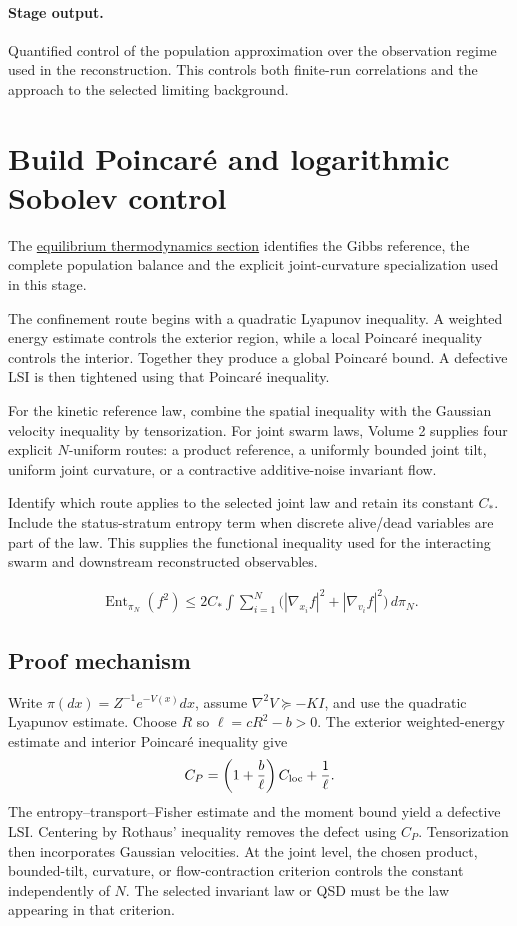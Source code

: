 \documentclass[11pt,a4paper]{article}
\begin{document}
\paragraph{Stage output.} Quantified control of the population approximation over the observation regime used in the reconstruction. This controls both finite-run correlations and the approach to the selected limiting background.

\section{Build Poincar\'e and logarithmic Sobolev control}
\label{stage:7}
The \hyperref[sec:equilibrium-thermodynamics]{equilibrium thermodynamics section} identifies the Gibbs reference, the complete population balance and the explicit joint-curvature specialization used in this stage.

The confinement route begins with a quadratic Lyapunov inequality. A weighted energy estimate controls the exterior region, while a local Poincar\'e inequality controls the interior. Together they produce a global Poincar\'e bound. A defective LSI is then tightened using that Poincar\'e inequality.

For the kinetic reference law, combine the spatial inequality with the Gaussian velocity inequality by tensorization. For joint swarm laws, Volume 2 supplies four explicit \(N\)-uniform routes: a product reference, a uniformly bounded joint tilt, uniform joint curvature, or a contractive additive-noise invariant flow.

Identify which route applies to the selected joint law and retain its constant \(C_*\). Include the status-stratum entropy term when discrete alive/dead variables are part of the law. This supplies the functional inequality used for the interacting swarm and downstream reconstructed observables.


\begin{gather*}
\operatorname{Ent}_{\pi_N}(f^2)\le 2C_*\int\sum_{i=1}^N
\bigl(|\nabla_{x_i}f|^2+|\nabla_{v_i}f|^2\bigr)\,d\pi_N.
\end{gather*}
\subsection*{Proof mechanism}
Write \(\pi(dx)=Z^{-1}e^{-V(x)}dx\), assume \(\nabla^2V\succeq-KI\), and use the quadratic Lyapunov estimate. Choose \(R\) so \(\ell=cR^2-b>0\). The exterior weighted-energy estimate and interior Poincar\'e inequality give
\[C_P=\left(1+\frac b\ell\right)C_{\rm loc}+\frac1\ell.\]
The entropy--transport--Fisher estimate and the moment bound yield a defective LSI. Centering by Rothaus' inequality removes the defect using \(C_P\). Tensorization then incorporates Gaussian velocities. At the joint level, the chosen product, bounded-tilt, curvature, or flow-contraction criterion controls the constant independently of \(N\). The selected invariant law or QSD must be the law appearing in that criterion.
\end{document}
